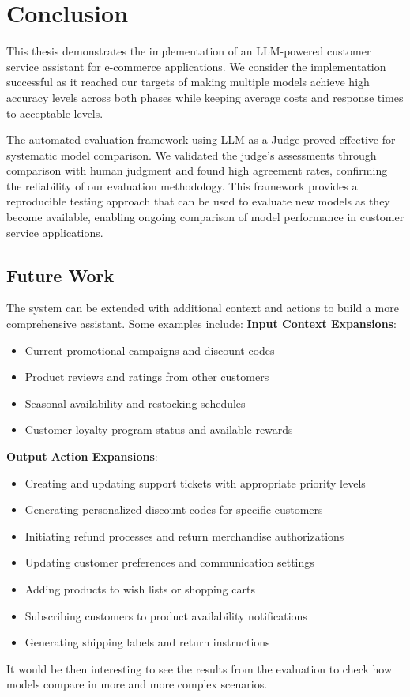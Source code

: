 \chapter{Conclusion}
\label{cha:conclusion}

This thesis demonstrates the implementation of an LLM-powered customer service assistant for e-commerce applications.
We consider the implementation successful as it reached our targets of making multiple models achieve high accuracy levels across both phases while keeping average costs and response times to acceptable levels.

The automated evaluation framework using LLM-as-a-Judge proved effective for systematic model comparison.
We validated the judge's assessments through comparison with human judgment and found high agreement rates, confirming the reliability of our evaluation methodology.
This framework provides a reproducible testing approach that can be used to evaluate new models as they become available, enabling ongoing comparison of model performance in customer service applications.

\section{Future Work}

The system can be extended with additional context and actions to build a more comprehensive assistant.
Some examples include:
\newline
\textbf{Input Context Expansions}:
\begin{itemize}
    \item Current promotional campaigns and discount codes
    \item Product reviews and ratings from other customers
    \item Seasonal availability and restocking schedules
    \item Customer loyalty program status and available rewards
\end{itemize}
\textbf{Output Action Expansions}:
\begin{itemize}
    \item Creating and updating support tickets with appropriate priority levels
    \item Generating personalized discount codes for specific customers
    \item Initiating refund processes and return merchandise authorizations
    \item Updating customer preferences and communication settings
    \item Adding products to wish lists or shopping carts
    \item Subscribing customers to product availability notifications
    \item Generating shipping labels and return instructions
\end{itemize}
It would be then interesting to see the results from the evaluation to check how models compare in more and more complex scenarios.
